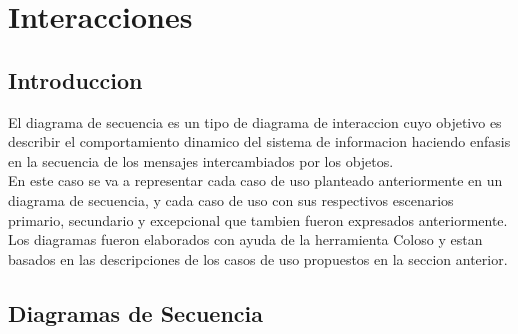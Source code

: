 \chapter{Interacciones}
\section{Introduccion}
\begin{flushleft}El diagrama de secuencia es un tipo de diagrama de interaccion cuyo objetivo es describir el comportamiento dinamico del sistema de informacion haciendo enfasis en la secuencia de los mensajes intercambiados por los objetos.
	\\
	En este caso se va a representar cada caso de uso planteado anteriormente en un diagrama de
	secuencia, y cada caso de uso con sus respectivos escenarios primario, secundario y excepcional que tambien fueron expresados anteriormente.
	\\
	Los diagramas fueron elaborados con ayuda de la herramienta Coloso y estan basados en las descripciones de los casos de uso propuestos en la seccion anterior.\end{flushleft}

\begin{flushleft}\end{flushleft}

\newpage
\section{Diagramas de Secuencia}
